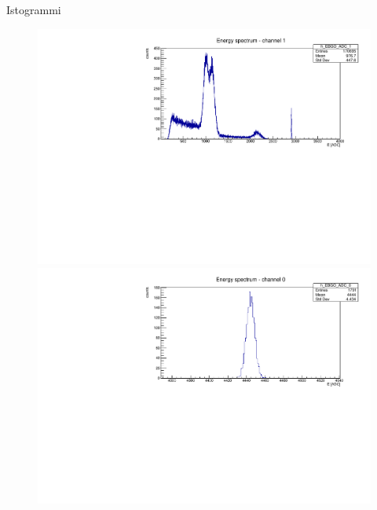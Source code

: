 \documentclass [xcolor=svgnames] {beamer}
\begin{document}
\begin{frame}{Istogrammi}
\begin{figure}
		\begin{minipage}{0.45\textwidth}
			\centering
			\includegraphics[width=\linewidth]{img/ex1777.pdf} %
		\end{minipage}
		\hfill
		\begin{minipage}{0.45\textwidth}
			\centering
			\includegraphics[width=\linewidth]{img/pulser.pdf} %
		\end{minipage}
	\end{figure}
\end{frame}

\end{document}
